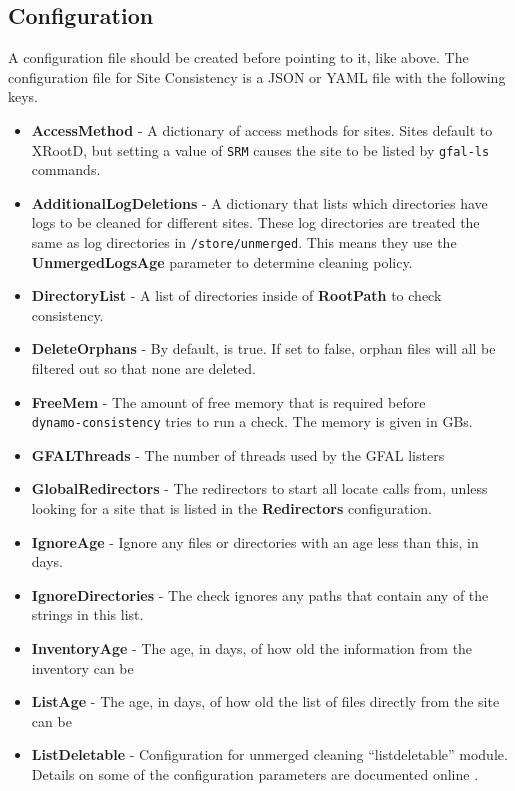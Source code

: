 \subsection{Configuration}

A configuration file should be created before pointing to it, like above.
The configuration file for Site Consistency is a JSON or YAML file with the following keys.
\begin{itemize}
\item {\bf AccessMethod} -
  A dictionary of access methods for sites.
  Sites default to XRootD, but setting a value of \texttt{SRM}
  causes the site to be listed by \texttt{gfal-ls} commands.
\item {\bf AdditionalLogDeletions} -
  A dictionary that lists which directories have logs to be cleaned for different sites.
  These log directories are treated the same as log directories in \texttt{/store/unmerged}.
  This means they use the {\bf UnmergedLogsAge} parameter to determine cleaning policy.
\item {\bf DirectoryList} -
  A list of directories inside of {\bf RootPath} to check consistency.
\item {\bf DeleteOrphans} -
  By default, is true.
  If set to false, orphan files will all be filtered out so that none are deleted.
\item {\bf FreeMem} -
  The amount of free memory that is required before \\
  \texttt{dynamo-consistency} tries to run a check.
  The memory is given in GBs.
\item {\bf GFALThreads} -
  The number of threads used by the GFAL listers
\item {\bf GlobalRedirectors} -
  The redirectors to start all locate calls from,
  unless looking for a site that is listed in the {\bf Redirectors} configuration.
\item {\bf IgnoreAge} -
  Ignore any files or directories with an age less than this, in days.
\item {\bf IgnoreDirectories} -
  The check ignores any paths that contain any of the strings in this list.
\item {\bf InventoryAge} -
  The age, in days, of how old the information from the inventory can be
\item {\bf ListAge} -
  The age, in days, of how old the list of files directly from the site can be
\item {\bf ListDeletable} -
  Configuration for unmerged cleaning “listdeletable” module.
  Details on some of the configuration parameters are documented online \cite{unmerged_opts}.

\end{itemize}
